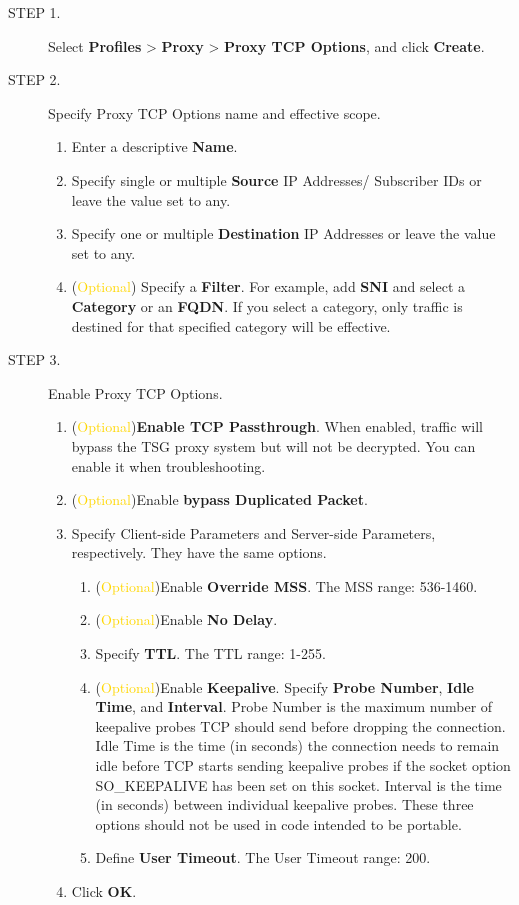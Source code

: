 \begin{description}
    \item[STEP 1.]	Select \textbf{Profiles} > \textbf{Proxy} > \textbf{Proxy TCP Options}, and click \textbf{Create}.
    \item[STEP 2.]	Specify Proxy TCP Options name and effective scope.
    \begin{enumerate}
        \item Enter a descriptive \textbf{Name}.
        \item Specify single or multiple \textbf{Source} IP Addresses/ Subscriber IDs or leave the value set to any.
        \item Specify one or multiple \textbf{Destination} IP Addresses or leave the value set to any.
        \item (\textcolor{gold}{Optional}) Specify a \textbf{Filter}. For example, add \textbf{SNI} and select a \textbf{Category} or an \textbf{FQDN}. If you select a category, only traffic is destined for that specified category will be effective.
    \end{enumerate}    
    \item[STEP 3.]	Enable Proxy TCP Options.
    \begin{enumerate}
        \item (\textcolor{gold}{Optional})\textbf{Enable TCP Passthrough}. When enabled, traffic will bypass the TSG proxy system but will not be decrypted. 
        You can enable it when troubleshooting.
        \item (\textcolor{gold}{Optional})Enable \textbf{bypass Duplicated Packet}.
        \item Specify Client-side Parameters and Server-side Parameters, respectively. They have the same options. 
        \begin{enumerate}
            \item (\textcolor{gold}{Optional})Enable \textbf{Override MSS}. The MSS range: 536-1460.
            \item (\textcolor{gold}{Optional})Enable \textbf{No Delay}.
            \item Specify \textbf{TTL}. The TTL range: 1-255.
            \item (\textcolor{gold}{Optional})Enable \textbf{Keepalive}. Specify \textbf{Probe Number}, \textbf{Idle Time}, and \textbf{Interval}. 
            Probe Number is the maximum number of keepalive probes TCP should send before dropping the connection. 
            Idle Time is the time (in seconds) the connection needs to remain idle before TCP starts sending keepalive probes 
            if the socket option SO\_KEEPALIVE has been set on this socket. Interval is the time (in seconds) between individual keepalive probes. 
            These three options should not be used in code intended to be portable.
            \item Define \textbf{User Timeout}. The User Timeout range: 200.
        \end{enumerate}        
        \item Click \textbf{OK}.
    \end{enumerate} 
\end{description} 

